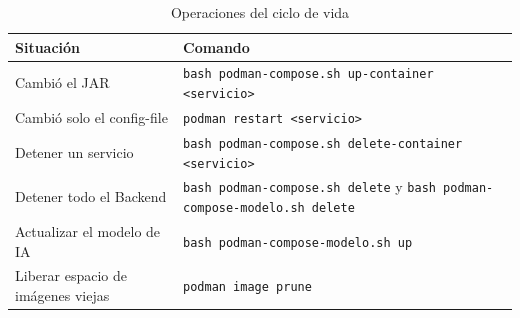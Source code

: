 \begin{table}[H]
\centering
\caption{Operaciones del ciclo de vida}
\small
\begin{tabular}{p{4.6cm}p{9.8cm}}
\toprule
\textbf{Situación} & \textbf{Comando} \\
\midrule
Cambió el JAR & \texttt{bash podman-compose.sh up-container <servicio>} \\
Cambió solo el config-file & \texttt{podman restart <servicio>} \\
Detener un servicio & \texttt{bash podman-compose.sh delete-container <servicio>} \\
Detener todo el Backend & \texttt{bash podman-compose.sh delete} y \texttt{bash podman-compose-modelo.sh delete} \\
Actualizar el modelo de IA & \texttt{bash podman-compose-modelo.sh up} \\
Liberar espacio de imágenes viejas & \texttt{podman image prune} \\
\bottomrule
\end{tabular}
\end{table}
